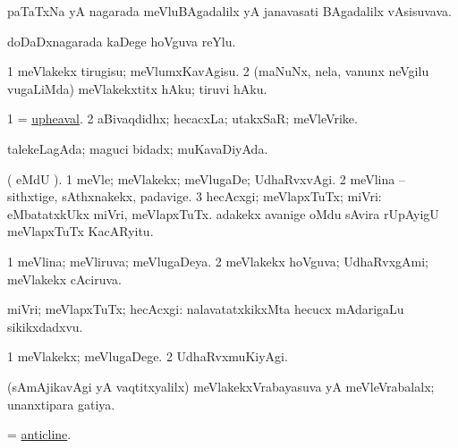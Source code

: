 \bentry
{} 
\gl{\nA}
\expl{}
\bmng
paTaTxNa yA nagarada meVluBAgadalilx yA janavasati BAgadalilx vAsisuvava. 
\emng
\eentry

\bentry
{} 
\gl{\nA}
\expl{}
\bmng
doDaDxnagarada kaDege hoVguva reYlu. 
\emng
\eentry

\bentry
{} 
\gl{\sakirx}
\expl{}
\bmng
\bnum
\num{1} meVlakekx tirugisu; meVlumxKavAgisu. 
\num{2} (maNuNx, nela, \mo vanunx neVgilu \mo vugaLiMda) meVlakekxtitx hAku; tiruvi hAku. 
\enum
\emng
\eentry

\bentry
{} 
\gl{\nA}
\expl{}
\bmng
\bnum
\num{1} = \hyperlink{upheaval}{upheaval}. 
\num{2} aBivaqdidhx; hecacxLa; utakxSaR; meVleVrike. 
\enum
\emng
\eentry

\bentry
{} 
\gl{\gu}
\expl{}
\bmng
talekeLagAda; maguci bidadx; muKavaDiyAda. 
\emng
\eentry

\bentry
{}
\gl{\saMkiSx}
\expl{}
\bmng
{} 
\emng
\eentry

\bentry
{} 
\gl{\kirxvi}
\expl{}
\bmng
( eMdU \parx). 
\bnum
\num{1} meVle; meVlakekx; meVlugaDe; UdhaRvxvAgi. 
\num{2} meVlina -- sithxtige, sAthxnakekx, padavige. 
\num{3} hecAcxgi; meVlapxTuTx; miVri:  eMbatatxkUkx miVri, meVlapxTuTx.  adakekx avanige oMdu sAvira rUpAyigU meVlapxTuTx KacARyitu. 
\enum
\emng
\eentry

\bentry
{} 
\gl{\gu}
\expl{}
\bmng
\bnum
\num{1} meVlina; meVliruva; meVlugaDeya. 
\num{2} meVlakekx hoVguva; UdhaRvxgAmi; meVlakekx cAciruva. 
\enum
\emng

\noindent 
\gl{\pagu}
\expl{}
\bmng
{} miVri; meVlapxTuTx; hecAcxgi:  nalavatatxkikxMta hecucx mAdarigaLu sikikxdadxvu. 
\emng
\eentry

\bentry
{} 
\gl{\kirxvi}
\expl{}
\bmng
\bnum
\num{1} meVlakekx; meVlugaDege. 
\num{2} UdhaRvxmuKiyAgi. 
\enum
\emng

\noindent
\gl{\pagu}
\expl{}
\bmng
{} (sAmAjikavAgi yA vaqtitxyalilx) meVlakekxVrabayasuva yA meVleVrabalalx; unanxtipara gatiya. 
\emng
\eentry

\bentry
{} 
\gl{\nA}
\expl{(\BUvi) }
\bmng
= \hyperref{kandict_a.pdf}{A}{anticline}{anticline}. 
\emng
\eentry

